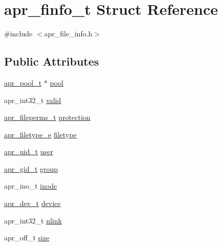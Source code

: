 \hypertarget{structapr__finfo__t}{}\section{apr\+\_\+finfo\+\_\+t Struct Reference}
\label{structapr__finfo__t}


{\ttfamily \#include $<$apr\+\_\+file\+\_\+info.\+h$>$}

\subsection*{Public Attributes}
\begin{DoxyCompactItemize}
\item 
\mbox{\hyperlink{group__apr__pools_gaf137f28edcf9a086cd6bc36c20d7cdfb}{apr\+\_\+pool\+\_\+t}} $\ast$ \mbox{\hyperlink{structapr__finfo__t_a71496f86b5489c87e58e9c03fe468fb8}{pool}}
\item 
apr\+\_\+int32\+\_\+t \mbox{\hyperlink{structapr__finfo__t_aff0cdf06637edec63c4701e582792019}{valid}}
\item 
\mbox{\hyperlink{group__apr__file__info_ga3af19c4c47007169064a70f9351bc7d8}{apr\+\_\+fileperms\+\_\+t}} \mbox{\hyperlink{structapr__finfo__t_a7c09d73ad1957e2c0e6c6b77d94e90ab}{protection}}
\item 
\mbox{\hyperlink{group__apr__file__info_gae3f0ce3014337a52b39852f8bf81ca7c}{apr\+\_\+filetype\+\_\+e}} \mbox{\hyperlink{structapr__finfo__t_a274ae0dd60b59182c2e0134bc9a09a20}{filetype}}
\item 
\mbox{\hyperlink{group__apr__user_gad1aa508f584bc230acf4f68ba4fc4de7}{apr\+\_\+uid\+\_\+t}} \mbox{\hyperlink{structapr__finfo__t_ab79d14bd50f50662d29ad433166c4bc5}{user}}
\item 
\mbox{\hyperlink{group__apr__user_ga22e9e224e984f837f3e276833e2f3a55}{apr\+\_\+gid\+\_\+t}} \mbox{\hyperlink{structapr__finfo__t_a15c9c056330308de4dafb3826a9b02bc}{group}}
\item 
apr\+\_\+ino\+\_\+t \mbox{\hyperlink{structapr__finfo__t_a73aebb666ddc391d53a871802c27eed6}{inode}}
\item 
\mbox{\hyperlink{group__apr__file__info_gae2c25c4b679613081599f776efa96c4a}{apr\+\_\+dev\+\_\+t}} \mbox{\hyperlink{structapr__finfo__t_a38cbfbff641284065481f5907d59c8bf}{device}}
\item 
apr\+\_\+int32\+\_\+t \mbox{\hyperlink{structapr__finfo__t_a98598f28735d75aa0c1994efc825e6d9}{nlink}}
\item 
apr\+\_\+off\+\_\+t \mbox{\hyperlink{structapr__finfo__t_a3e47a673c5b82a25a783a732dee6f946}{size}}

\end{DoxyCompactItemize}
